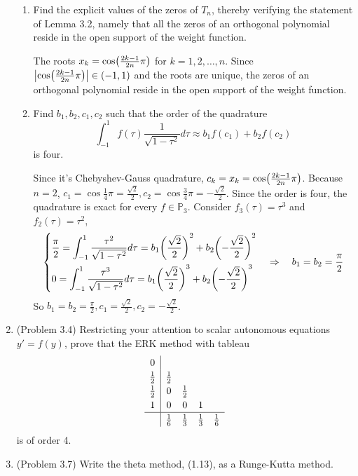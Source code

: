 \documentclass[10pt]{report}
\newcommand{\ds}{\displaystyle}
\newcommand{\dintt}[4] {\int_{#1}^{#2} #3 d#4}
\newcommand{\abs}[1] {\left| #1 \right|}
\DeclarePairedDelimiter\autoparen{(}{)}
\newcommand{\pa}[1]{\autoparen*{#1}}
\begin{document}
\begin{enumerate}
\begin{enumerate}
		\item 
		Find the explicit values of the zeros of $T_n$, thereby verifying the statement of Lemma 3.2, namely that all the zeros of an orthogonal polynomial reside in the open support of the weight function.
		
		The roots $x_k = \cos\pa{\frac{2k-1}{2n}\pi}$ for $k=1,2,\dots,n$. Since $\abs{\cos\pa{\frac{2k-1}{2n}\pi}} \in (-1,1)$ and the roots are unique, the zeros of an orthogonal polynomial reside in the open support of the weight function.
		
		\item 
		Find $b_1, b_2, c_1, c_2$ such that the order of the quadrature
		\[
		\dintt{-1}{1}{f(\tau) \frac{1}{\sqrt{1-\tau^2}}}{\tau} \approx b_1 f(c_1) + b_2 f(c_2)
		\]
		is four. 
		
		Since it's Chebyshev-Gauss quadrature, $c_k = x_k = \cos\pa{\frac{2k-1}{2n}\pi}$. Because $n=2$, $c_1 = \cos \frac{1}{4}\pi = \frac{\sqrt{2}}{2}, c_2 = \cos \frac{3}{4}\pi = -\frac{\sqrt{2}}{2}$. Since the order is four, the quadrature is exact for every $f\in \mathbb{P}_3$. Consider $f_3(\tau) = \tau^3$ and $f_2(\tau) = \tau^2$,
		\[
		\begin{cases*}
			\ds \frac{\pi}{2} = \dintt{-1}{1}{\frac{\tau
					^2}{\sqrt{1-\tau^2}}}{\tau}
				= b_1 \pa{\frac{\sqrt{2}}{2}}^2 + b_2 \pa{-\frac{\sqrt{2}}{2}}^2\\
			\ds 0 = \dintt{-1}{1}{\frac{\tau
					^3}{\sqrt{1-\tau^2}}}{\tau}
			= b_1 \pa{\frac{\sqrt{2}}{2}}^3 + b_2 \pa{-\frac{\sqrt{2}}{2}}^3
		\end{cases*}
		\quad\Rightarrow\quad
		b_1 = b_2 = \frac{\pi}{2}
		\]
		So $b_1 = b_2 = \frac{\pi}{2}, c_1 = \frac{\sqrt{2}}{2}, c_2 = -\frac{\sqrt{2}}{2}$.
		
	\end{enumerate}

	\item 
	(Problem 3.4) Restricting your attention to scalar autonomous equations $y' = f(y)$, prove that the ERK method with tableau
	\[
	\renewcommand{\arraystretch}{1.2}
	\begin{array}{c|cccc}
		0 &&&&\\
		\frac{1}{2} & \frac{1}{2} &&&\\
		\frac{1}{2} & 0 & \frac{1}{2} &&\\
		1 & 0 & 0 & 1 &\\ \hline
		& \frac{1}{6} & \frac{1}{3} & \frac{1}{3} & \frac{1}{6}
	\end{array}
	\]
	is of order 4.
	
	\item 
	(Problem 3.7) Write the theta method, (1.13), as a Runge-Kutta method.
\end{enumerate}
\end{document}
